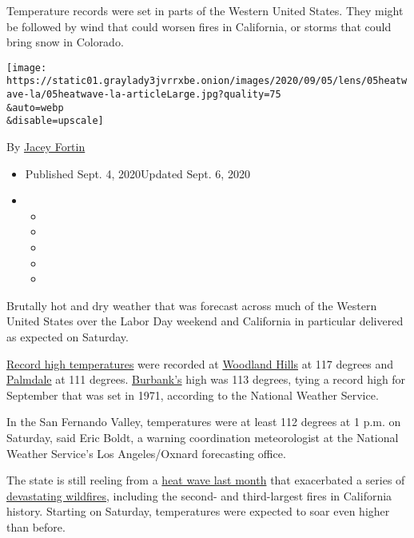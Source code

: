 Temperature records were set in parts of the Western United States. They
might be followed by wind that could worsen fires in California, or
storms that could bring snow in Colorado.

\texttt{[image: https://static01.graylady3jvrrxbe.onion/images/2020/09/05/lens/05heatwave-la/05heatwave-la-articleLarge.jpg?quality=75\\\&auto=webp\\\&disable=upscale]}

By \href{https://www.nytimes3xbfgragh.onion/by/jacey-fortin}{Jacey
Fortin}

\begin{itemize}
\item
  Published Sept. 4, 2020Updated Sept. 6, 2020
\item
  \begin{itemize}
  \item
  \item
  \item
  \item
  \item
  \end{itemize}
\end{itemize}

Brutally hot and dry weather that was forecast across much of the
Western United States over the Labor Day weekend and California in
particular delivered as expected on Saturday.

\href{https://www.nytimes3xbfgragh.onion/article/california-weather.html}{Record
high temperatures} were recorded at
\href{https://twitter.com/NWSLosAngeles/status/1302367254953164800?s=20}{Woodland
Hills} at 117 degrees and
\href{https://twitter.com/NWSLosAngeles/status/1302382428007194624?s=20}{Palmdale}
at 111 degrees.
\href{https://twitter.com/NWSLosAngeles/status/1302388165332721664?s=20}{Burbank's}
high was 113 degrees, tying a record high for September that was set in
1971, according to the National Weather Service.

In the San Fernando Valley, temperatures were at least 112 degrees at 1
p.m. on Saturday, said Eric Boldt, a warning coordination meteorologist
at the National Weather Service's Los Angeles/Oxnard forecasting office.

The state is still reeling from a
\href{https://www.nytimes3xbfgragh.onion/2020/08/15/us/california-heat-wave-blackout.html}{heat
wave last month} that exacerbated a series of
\href{https://www.nytimes3xbfgragh.onion/2020/08/19/us/california-wildfires-photos.html}{devastating
wildfires}, including the second- and third-largest fires in California
history. Starting on Saturday, temperatures were expected to soar even
higher than before.

